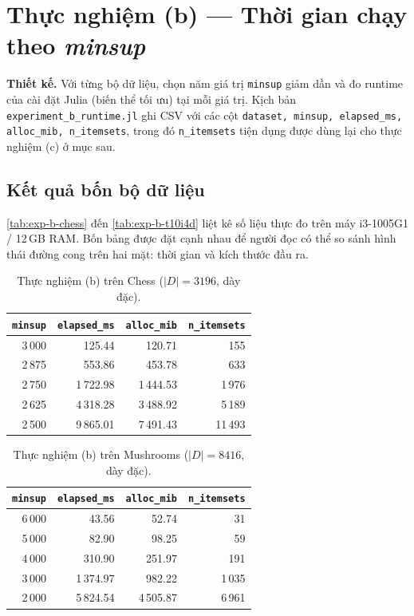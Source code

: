 \section{Thực nghiệm (b) --- Thời gian chạy theo \textit{minsup}}
\label{sec:exp-b}

\textbf{Thiết kế.} Với từng bộ dữ liệu, chọn năm giá trị \texttt{minsup} giảm dần và đo runtime của cài đặt Julia (biến thể tối ưu) tại mỗi giá trị. Kịch bản \texttt{experiment\_b\_runtime.jl} ghi CSV với các cột \texttt{dataset, minsup, elapsed\_ms, alloc\_mib, n\_itemsets}, trong đó \texttt{n\_itemsets} tiện dụng được dùng lại cho thực nghiệm (c) ở mục sau.

\subsection{Kết quả bốn bộ dữ liệu}

\autoref{tab:exp-b-chess} đến \autoref{tab:exp-b-t10i4d} liệt kê số liệu thực đo trên máy i3-1005G1 / 12\,GB RAM. Bốn bảng được đặt cạnh nhau để người đọc có thể so sánh hình thái đường cong trên hai mặt: thời gian và kích thước đầu ra.

\begin{table}[htbp]
    \centering
    \caption{Thực nghiệm (b) trên Chess ($|D|=3196$, dày đặc).}
    \label{tab:exp-b-chess}
    \begin{tabular}{r|r|r|r}
        \hline
        \texttt{minsup} & \texttt{elapsed\_ms} & \texttt{alloc\_mib} & \texttt{n\_itemsets} \\ \hline
        3\,000 & 125.44    & 120.71     & 155 \\
        2\,875 & 553.86    & 453.78     & 633 \\
        2\,750 & 1\,722.98 & 1\,444.53  & 1\,976 \\
        2\,625 & 4\,318.28 & 3\,488.92  & 5\,189 \\
        2\,500 & 9\,865.01 & 7\,491.43  & 11\,493 \\
        \hline
    \end{tabular}
\end{table}

\begin{table}[htbp]
    \centering
    \caption{Thực nghiệm (b) trên Mushrooms ($|D|=8416$, dày đặc).}
    \label{tab:exp-b-mushrooms}
    \begin{tabular}{r|r|r|r}
        \hline
        \texttt{minsup} & \texttt{elapsed\_ms} & \texttt{alloc\_mib} & \texttt{n\_itemsets} \\ \hline
        6\,000 & 43.56     & 52.74     & 31 \\
        5\,000 & 82.90     & 98.25     & 59 \\
        4\,000 & 310.90    & 251.97    & 191 \\
        3\,000 & 1\,374.97 & 982.22    & 1\,035 \\
        2\,000 & 5\,824.54 & 4\,505.87 & 6\,961 \\
        \hline
    \end{tabular}
\end{table}

